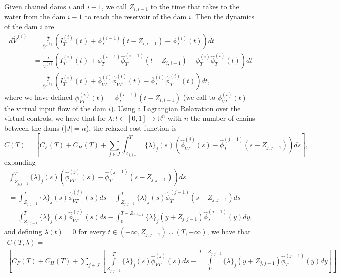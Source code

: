 \documentclass[12pt]{article}
\theoremstyle{definition}
\theoremstyle{remark}
\newcommand{\R}{\mathbb{R}}
\begin{document}
Given chained dams $i$ and $i-1$, we call $Z_{i,i-1}$ to the time that takes to the water from the dam $i-1$ to reach the reservoir of the dam $i$. Then the dynamics of the dam $i$ are
\begin{equation*}
\begin{split}
d\hat{V}^{(i)}&=\frac{\overline{T}}{\overline{V}^{(i)}}\left(I_T^{(i)}(t)+\phi_{T}^{(i-1)}(t-Z_{i,i-1})-\phi_T^{(i)}(t)\right)dt\\
&=\frac{\overline{T}}{\overline{V}^{(i)}}\left(I_T^{(i)}(t)+\overline{\phi}_{T}^{(i-1)}\hat{\phi}_{T}^{(i-1)}(t-Z_{i,i-1})-\overline{\phi}_T^{(i)}\hat{\phi}_T^{(i)}(t)\right)dt\\
&=\frac{\overline{T}}{\overline{V}^{(i)}}\left(I_T^{(i)}(t)+\overline{\phi}_{VT}^{(i)}\hat{\phi}_{VT}^{(i)}(t)-\overline{\phi}_T^{(i)}\hat{\phi}_T^{(i)}(t)\right)dt,
\end{split}
\end{equation*}
where we have defined $\phi_{VT}^{(i)}(t)=\phi_{T}^{(i-1)}(t-Z_{i,i-1})$ (we call to $\phi_{VT}^{(i)}(t)$ the virtual input flow of the dam $i$). 
Using a Lagrangian Relaxation over the virtual controls, we have that for $\lambda:t\subset[0,1]\to\R^n$ with $n$ the number of chains between the dams ($|J|=n$), the relaxed cost function is
\begin{equation*}
C(T)=\left[C_F(T)+C_H(T)+\sum_{j\in J}\int_{Z_{j,j-1}}^T\{\lambda\}_j(s)\left(\hat{\phi}_{VT}^{(j)}(s)-\hat{\phi}_{T}^{(j-1)}(s-Z_{j,j-1})\right)ds\right],
\end{equation*}
expanding
\begin{multline*}
\int_{Z_{j,j-1}}^T\{\lambda\}_j(s)\left(\hat{\phi}_{VT}^{(j)}(s)-\hat{\phi}_{T}^{(j-1)}(s-Z_{j,j-1})\right)ds=\\
=\int_{Z_{j,j-1}}^T\{\lambda\}_j(s)\hat{\phi}_{VT}^{(j)}(s)ds-\int_{Z_{j,j-1}}^T\{\lambda\}_j(s)\hat{\phi}_{T}^{(j-1)}(s-Z_{j,j-1})ds\\
=\int_{Z_{j,j-1}}^T\{\lambda\}_j(s)\hat{\phi}_{VT}^{(j)}(s)ds-\int_0^{T-Z_{j,j-1}}\{\lambda\}_j(y+Z_{j,j-1})\hat{\phi}_{T}^{(j-1)}(y)dy,
\end{multline*}
and defining $\lambda(t)=0$ for every $t\in(-\infty,Z_{j,j-1})\cup(T,+\infty)$, we have that
\begin{multline*}
C(T,\lambda)=\\
\left[C_F(T)+C_H(T)+\sum_{j\in J}\left[\int\limits_{Z_{j,j-1}}^T\{\lambda\}_j(s)\hat{\phi}_{VT}^{(j)}(s)ds-\int\limits_0^{T-Z_{j,j-1}}\{\lambda\}_j(y+Z_{j,j-1})\hat{\phi}_{T}^{(j-1)}(y)dy\right]\right]
\end{multline*}
\end{document}
